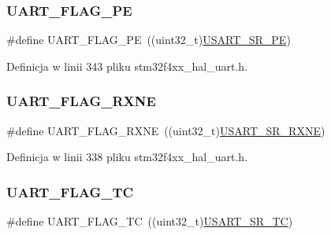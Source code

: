 \subsubsection{\texorpdfstring{U\+A\+R\+T\+\_\+\+F\+L\+A\+G\+\_\+\+PE}{UART\_FLAG\_PE}}
{\footnotesize\ttfamily \#define U\+A\+R\+T\+\_\+\+F\+L\+A\+G\+\_\+\+PE~((uint32\+\_\+t)\hyperlink{group___peripheral___registers___bits___definition_gac88be3484245af8c1b271ae5c1b97a14}{U\+S\+A\+R\+T\+\_\+\+S\+R\+\_\+\+PE})}



Definicja w linii 343 pliku stm32f4xx\+\_\+hal\+\_\+uart.\+h.

\mbox{\label{group___u_a_r_t___flags_ga9d1b2860d84a87abb05c3b2fed3c108c}} 
\subsubsection{\texorpdfstring{U\+A\+R\+T\+\_\+\+F\+L\+A\+G\+\_\+\+R\+X\+NE}{UART\_FLAG\_RXNE}}
{\footnotesize\ttfamily \#define U\+A\+R\+T\+\_\+\+F\+L\+A\+G\+\_\+\+R\+X\+NE~((uint32\+\_\+t)\hyperlink{group___peripheral___registers___bits___definition_gaa0c99e2bb265b3d58a91aca7a93f7836}{U\+S\+A\+R\+T\+\_\+\+S\+R\+\_\+\+R\+X\+NE})}



Definicja w linii 338 pliku stm32f4xx\+\_\+hal\+\_\+uart.\+h.

\mbox{\label{group___u_a_r_t___flags_ga82e68a0ee4a8b987a47c66fc6f744894}} 
\subsubsection{\texorpdfstring{U\+A\+R\+T\+\_\+\+F\+L\+A\+G\+\_\+\+TC}{UART\_FLAG\_TC}}
{\footnotesize\ttfamily \#define U\+A\+R\+T\+\_\+\+F\+L\+A\+G\+\_\+\+TC~((uint32\+\_\+t)\hyperlink{group___peripheral___registers___bits___definition_ga76229b05ac37a5a688e6ba45851a29f1}{U\+S\+A\+R\+T\+\_\+\+S\+R\+\_\+\+TC})}



